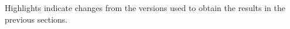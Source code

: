 \begin{table}
\begin{threeparttable}
\begin{tabular}{lllllll}
    \bottomrule
    \end{tabular}
    \begin{tablenotes}
        \item Highlights indicate changes from the versions used to obtain the results in the previous sections.
    \end{tablenotes}
    \end{threeparttable}
\end{table}
